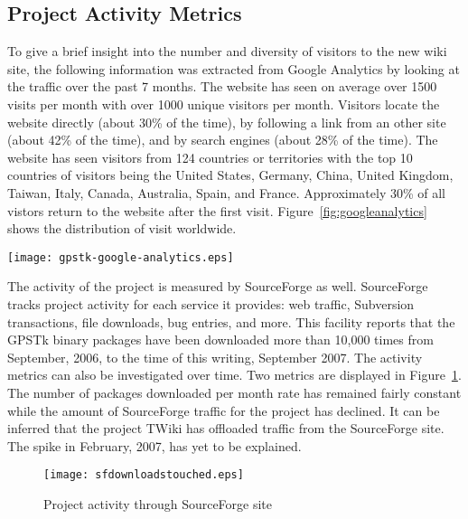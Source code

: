 \documentclass[letterpaper,ugly,10pt]{ion-gps}
\begin{document}
\subsection*{Project Activity Metrics}

To give a brief insight into the number and diversity of visitors to the new wiki site, the following information was extracted from Google Analytics by looking at the traffic over the past 7 months.  The website has seen on average over 1500 visits per month with over 1000 unique visitors per month. Visitors locate the website directly (about 30\% of the time), by following a link from an other site (about 42\% of the time), and by search engines (about 28\% of the time).  The website has seen visitors from 124 countries or territories with the top 10 countries of visitors being the United States, Germany, China, United Kingdom, Taiwan, Italy, Canada, Australia, Spain, and France. Approximately 30\% of all vistors return to the website after the first visit.  Figure~\ref{fig:googleanalytics} shows the distribution of visit worldwide.
%
\begin{figure*}
	\centering
	\texttt{[image: gpstk-google-analytics.eps]}
	\caption{Website visitor distribution, March to September 2007, courtesy Google Analytics}
	\label{fig:googleanalytics}
\end{figure*}

The activity of the project is measured by SourceForge as well. SourceForge tracks project activity for each service it provides: web traffic, Subversion transactions, file downloads, bug entries, and more. This facility reports that the GPSTk binary packages have been downloaded more than 10,000 times from September, 2006, to the time of this writing, September 2007. The activity metrics can also be investigated over time. Two metrics are displayed in Figure~\ref{fig:sfactivity}. The number of packages downloaded per month rate has remained fairly constant while the amount of SourceForge traffic for the project has declined. It can be inferred that the project TWiki has offloaded traffic from the SourceForge site. The spike in February, 2007, has yet to be explained.

%
\begin{figure}
	\centering
	\texttt{[image: sfdownloadstouched.eps]}
	\caption{Project activity through SourceForge site}
	\label{fig:sfactivity}
\end{figure}
\end{document}
